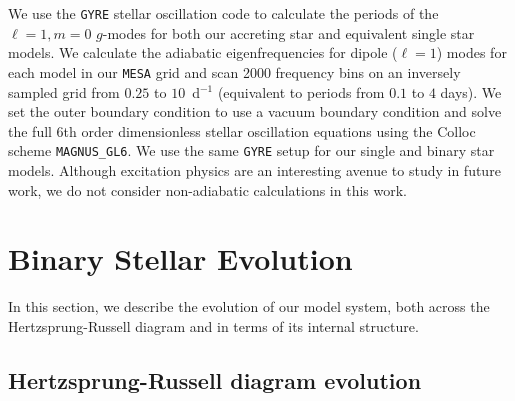 \documentclass[desactivate]{aa}
\begin{document}
We use the \texttt{GYRE} stellar oscillation code \citep[version 7.1, ][]{Townsend+2013,Townsend+2018,Goldstein+2020,Sun+2023} to calculate the periods of the ${\ell = 1}, {m = 0}$ $g$-modes for both our accreting star and equivalent single star models. We calculate the adiabatic eigenfrequencies for dipole ($\ell=1$) modes for each model in our \texttt{MESA} grid and scan 2000 frequency bins on an inversely sampled grid from $0.25$ to $10$~d$^{-1}$ (equivalent to periods from $0.1$ to $4$ days). We set the outer boundary condition to use a vacuum boundary condition and solve the full 6th order dimensionless stellar oscillation equations \citep{Dziembowski+1971, Christensen-Dalsgaard+2008} using the Colloc scheme \texttt{MAGNUS\_GL6}. We use the same \texttt{GYRE} setup for our single and binary star models. Although excitation physics are an interesting avenue to study in future work, we do not consider non-adiabatic calculations in this work.

\section{Binary Stellar Evolution}\label{sec:bse}

In this section, we describe the evolution of our model system, both across the Hertzsprung-Russell diagram and in terms of its internal structure.

\subsection{Hertzsprung-Russell diagram evolution}\label{sec:hrd}
\end{document}
